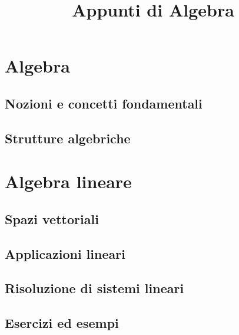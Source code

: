 



\title{Appunti di Algebra}

\maketitle

\tableofcontents

\part{Algebra}

\chapter{Nozioni e concetti fondamentali}



\chapter{Strutture algebriche}



\part{Algebra lineare}

\chapter{Spazi vettoriali}



\chapter{Applicazioni lineari}



\chapter{Risoluzione di sistemi lineari}



\chapter{Esercizi ed esempi}



\listoftables

\listoffigures


